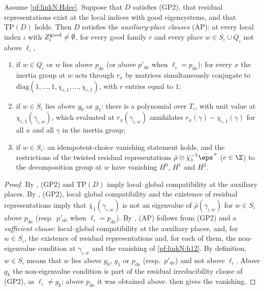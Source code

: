 \begin{lemma}\label{pf:linkN:g5}
Assume \cref{pf:linkN:Hdec}. Suppose that $D$ satisfies (GP2), that residual representations exist at the local indices with good
eigensystems, and that $\mathrm{TP}(D)$ holds. Then $D$ satisfies the \emph{auxiliary-place clauses} (AP): at every local index
$\iota$ with $Z^{\mathrm{good}}_\iota\ne\emptyset$, for every good family $r$ and every place $w\in S_\iota\cup Q_\iota$ not above $\ell_\iota$,
\begin{enumerate}[label=(\roman*)]
\item if $w\in Q_\iota$ or $w$ lies above $p_{\mathrm{de}}$ (or above $p'_{\mathrm{de}}$ when $\ell_\iota=p_{\mathrm{de}}$): for every $x$ the
inertia group at $w$ acts through $r_x$ by matrices simultaneously conjugate to $\mathrm{diag}(1,\dots,1,\chi_{\iota,1},\dots,\chi_{\iota,1})$,
with $r$ entries equal to $1$;
\item if $w\in S_\iota$ lies above $g_0$ or $g_1$: there is a polynomial over $T_\iota$, with unit value at $\chi_{\iota,1}(\gamma_{\iota,w})$,
which evaluated at $r_x(\gamma_{\iota,w})$ annihilates $r_x(\gamma)-\chi_{\iota,1}(\gamma)$ for all $x$ and all $\gamma$ in the inertia group;
\item if $w\in S_\iota$: an idempotent-choice vanishing statement holds, and the restrictions of the twisted residual representations
$\bar\rho\otimes\bar\chi_1^{-1}\bar\eps^{\,e}$ ($e\in\Z$) to the decomposition group at $w$ have vanishing $H^0$, $H^1$ and $H^2$.
\end{enumerate}
\end{lemma}

\begin{proof}
By , (GP2) and $\mathrm{TP}(D)$ imply local--global compatibility at the auxiliary
places. By , (GP2), local--global compatibility and the existence of residual
representations imply that $\bar\chi_1(\gamma_{\iota,w})$ is not an eigenvalue of $\bar\rho(\gamma_{\iota,w})$ for $w\in S_\iota$ above
$p_{\mathrm{de}}$ (resp.\ $p'_{\mathrm{de}}$ when $\ell_\iota=p_{\mathrm{de}}$). By
, (AP) follows from (GP2) and a
\emph{sufficient clause}: local--global compatibility at the auxiliary places, and, for $w\in S_\iota$, the existence of residual
representations and, for each of them, the non-eigenvalue condition at $\gamma_{\iota,w}$ and the vanishing of \cref{pf:linkN:h12}.
By definition, $w\in S_\iota$ means that $w$ lies above $g_0$, $g_1$ or $p_{\mathrm{de}}$ (resp.\ $p'_{\mathrm{de}}$) and not above
$\ell_\iota$. Above $g_k$ the non-eigenvalue condition is part of the residual irreducibility clause of (GP2), as $\ell_\iota\ne g_k$;
above $p_{\mathrm{de}}$ it was obtained above.  then gives the vanishing.
\end{proof}

